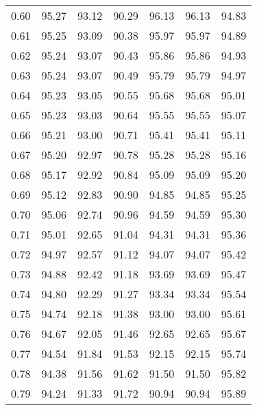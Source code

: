 \begin{tabular}{|c|c|c|c|c|c|c|}
      0.60 &     95.27 &     93.12 &      90.29 &   96.13 &      96.13 &         94.83 \\
      0.61 &     95.25 &     93.09 &      90.38 &   95.97 &      95.97 &         94.89 \\
      0.62 &     95.24 &     93.07 &      90.43 &   95.86 &      95.86 &         94.93 \\
      0.63 &     95.24 &     93.07 &      90.49 &   95.79 &      95.79 &         94.97 \\
      0.64 &     95.23 &     93.05 &      90.55 &   95.68 &      95.68 &         95.01 \\
      0.65 &     95.23 &     93.03 &      90.64 &   95.55 &      95.55 &         95.07 \\
      0.66 &     95.21 &     93.00 &      90.71 &   95.41 &      95.41 &         95.11 \\
      0.67 &     95.20 &     92.97 &      90.78 &   95.28 &      95.28 &         95.16 \\
      0.68 &     95.17 &     92.92 &      90.84 &   95.09 &      95.09 &         95.20 \\
      0.69 &     95.12 &     92.83 &      90.90 &   94.85 &      94.85 &         95.25 \\
      0.70 &     95.06 &     92.74 &      90.96 &   94.59 &      94.59 &         95.30 \\
      0.71 &     95.01 &     92.65 &      91.04 &   94.31 &      94.31 &         95.36 \\
      0.72 &     94.97 &     92.57 &      91.12 &   94.07 &      94.07 &         95.42 \\
      0.73 &     94.88 &     92.42 &      91.18 &   93.69 &      93.69 &         95.47 \\
      0.74 &     94.80 &     92.29 &      91.27 &   93.34 &      93.34 &         95.54 \\
      0.75 &     94.74 &     92.18 &      91.38 &   93.00 &      93.00 &         95.61 \\
      0.76 &     94.67 &     92.05 &      91.46 &   92.65 &      92.65 &         95.67 \\
      0.77 &     94.54 &     91.84 &      91.53 &   92.15 &      92.15 &         95.74 \\
      0.78 &     94.38 &     91.56 &      91.62 &   91.50 &      91.50 &         95.82 \\
      0.79 &     94.24 &     91.33 &      91.72 &   90.94 &      90.94 &         95.89 \\

\end{tabular}
